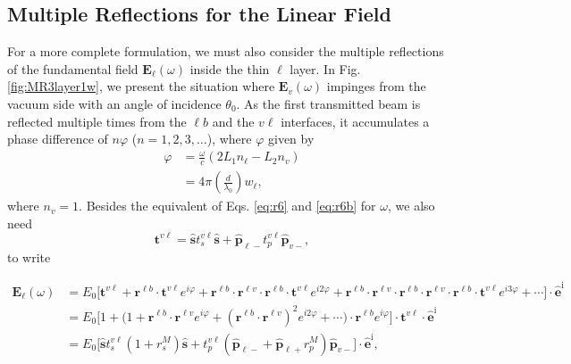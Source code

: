 \documentclass[aps,prb,10pt,showpacs,letterpaper,twocolumn]{revtex4-1}
\begin{document}

\subsection{Multiple Reflections for the Linear Field}\label{sec:multiple1w}

For a more complete formulation, we must also consider the multiple reflections
of the fundamental field $\mathbf{E}_{\ell}(\omega)$ inside the thin $\ell$
layer. In Fig. \ref{fig:MR3layer1w}, we present the situation where
$\mathbf{E}_{v}(\omega)$ impinges from the vacuum side with an angle of
incidence $\theta_{0}$. As the first transmitted beam is reflected multiple
times from the $\ell b$ and the $v\ell$ interfaces, it accumulates a phase
difference of $n\varphi$ ($n=1,2,3,\ldots$), where $\varphi$ given by
\begin{equation}\label{mphi}
\begin{split}
\varphi &= \frac{\omega}{c}(2L_{1}n_{\ell} - L_{2}n_{v})\\
&= 4\pi\left(\frac{d}{\lambda_{0}}\right)w_{\ell},
\end{split}
\end{equation}
where $n_{v} = 1$. Besides the equivalent of Eqs. \eqref{eq:r6} and
\eqref{eq:r6b} for $\omega$, we also need
\begin{equation}\label{eq:mvv}
\mathbf{t}^{v\ell}
= \hat{\mathbf{s}}t_{s}^{v\ell}\hat{\mathbf{s}} 
+ \hat{\mathbf{p}}_{\ell -}t_{p}^{v\ell}\hat{\mathbf{p}}_{v-},
\end{equation}
to write
\begin{widetext}
\begin{equation}\label{eq:mcvew}
\begin{split}
\mathbf{E}_\ell(\omega)
&= E_{0}
\Big[
\mathbf{t}^{v\ell} + \mathbf{r}^{\ell b}\cdot\mathbf{t}^{v\ell}e^{i\varphi}
 + \mathbf{r}^{\ell b}\cdot\mathbf{r}^{\ell v}\cdot
   \mathbf{r}^{\ell b}\cdot\mathbf{t}^{v\ell} e^{i2\varphi}
 + \mathbf{r}^{\ell b}\cdot\mathbf{r}^{\ell v}\cdot
   \mathbf{r}^{\ell b}\cdot\mathbf{r}^{\ell v}\cdot
   \mathbf{r}^{\ell b}\cdot\mathbf{t}^{v\ell} e^{i3\varphi}
 + \cdots
\Big]\cdot\hat{\mathbf{e}}^{\mathrm{i}}\\
&= E_{0}
\Big[
1 + \Big(1 + \mathbf{r}^{\ell b}\cdot\mathbf{r}^{\ell v}e^{i\varphi}
+ (\mathbf{r}^{\ell b}\cdot\mathbf{r}^{\ell v})^2e^{i2\varphi}+\cdots\Big)\cdot
\mathbf{r}^{\ell b}e^{i\varphi}
\Big]
\cdot\mathbf{t}^{v\ell}\cdot\hat{\mathbf{e}}^{\mathrm{i}}\\
&= E_{0}
\Big[
\hat{\mathbf{s}} t^{v\ell}_{s}(1+r^{M}_{s})\hat{\mathbf{s}} 
+ t^{v\ell}_{p}
\left(\hat{\mathbf{p}}_{\ell-}+\hat{\mathbf{p}}_{\ell+}r^{M}_{p}\right)
\hat{\mathbf{p}}_{v-}
\Big]\cdot\hat{\mathbf{e}}^{\mathrm{i}},
\end{split}
\end{equation}
\end{widetext}
\end{document}
